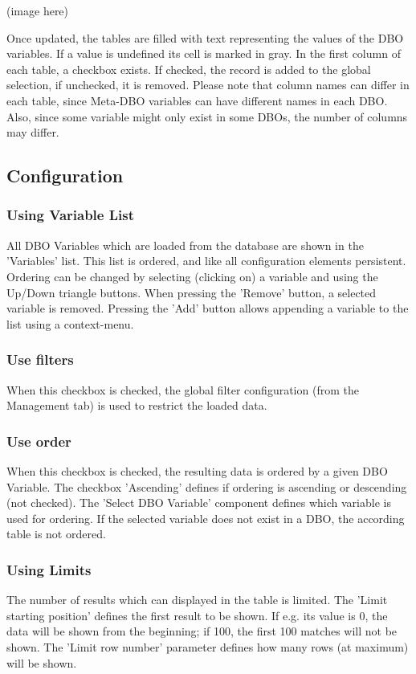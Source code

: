 \documentclass[10pt,letterpaper,extrafontsizes]{memoir}
\begin{document}
(image here)

Once updated, the tables are filled with text representing the values of the DBO variables.  If a value is
undefined its cell is marked in gray.
In the first column of each table, a checkbox exists. If checked, the record is added to the global selection,
if unchecked, it is removed.
Please note that column names can differ in each table, since Meta-DBO variables can have different
names in each DBO. Also, since some variable might only exist in some DBOs, the number of columns
may differ.

\subsection{Configuration}
\subsubsection{Using Variable List}
All DBO Variables which are loaded from the database are shown in the 'Variables' list. This list is ordered,
and like all configuration elements persistent. Ordering can be changed by selecting (clicking on) a variable
and using the Up/Down triangle buttons.
When pressing the 'Remove' button, a selected variable is removed.  Pressing the 'Add' button allows
appending a variable to the list using a context-menu.

\subsubsection{Use filters}
When this checkbox is checked, the global filter configuration (from the Management tab) is used to restrict
the loaded data.

\subsubsection{Use order}
When this checkbox is checked, the resulting data is ordered by a given DBO Variable.  The checkbox
'Ascending' defines if ordering is ascending or descending (not checked).   The 'Select DBO Variable'
component defines which variable is used for ordering.  If the selected variable does not exist in a DBO,
the according table is not ordered.

\subsubsection{Using Limits}
The number of results which can displayed in the table is limited. The 'Limit starting position' defines the
first result to be shown. If e.g. its value is 0, the data will be shown from the beginning; if 100, the first 100
matches will not be shown.
The 'Limit row number' parameter defines how many rows (at maximum) will be shown.
\end{document}
